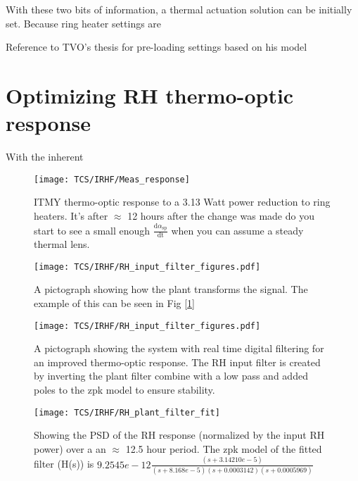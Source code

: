 With these two bits of information, a thermal actuation solution can be initially set. Because ring heater settings are 


Reference to TVO's thesis for pre-loading settings based on his model \cite{tvo}

\section{Optimizing RH thermo-optic response}
With the inherent
\begin{figure}[H]
 \texttt{[image: TCS/IRHF/Meas\_response]}
 \caption{ITMY thermo-optic response to a 3.13 Watt power reduction to ring heaters. It's after $\approx$ 12 hours after the change was made do you start to see a small enough $\frac{\mathrm{d} \alpha_\mathrm{sp}}{\mathrm{dt}}$ when you can assume a steady thermal lens.}
 \label{fig:meas}
\end{figure}

\begin{figure}[H]
\texttt{[image: TCS/IRHF/RH\_input\_filter\_figures.pdf]}
\caption{A pictograph showing how the plant transforms the signal. The example of this can be seen in Fig [\ref{fig:meas}]}
\label{fig:justplant}
\end{figure}

\begin{figure}[H]
\texttt{[image: TCS/IRHF/RH\_input\_filter\_figures.pdf]}
\caption{A pictograph showing the system with real time digital filtering for an improved thermo-optic response. The RH input filter is created by inverting the plant filter combine with a low pass and added poles to the zpk model to ensure stability.}
\label{fig:plantwfilt}
\end{figure}

\begin{figure}[H]
\texttt{[image: TCS/IRHF/RH\_plant\_filter\_fit]}
\caption{Showing the PSD of the RH response (normalized by the input RH power) over a an $\approx$ 12.5 hour period. The zpk model of the fitted filter (H(s)) is $9.2545e-12 \frac{(s+3.14210e-5)}{(s+8.168e-5)(s+0.0003142)(s+0.0005969)}$}
\label{fig:plant_v_fit}
\end{figure}


